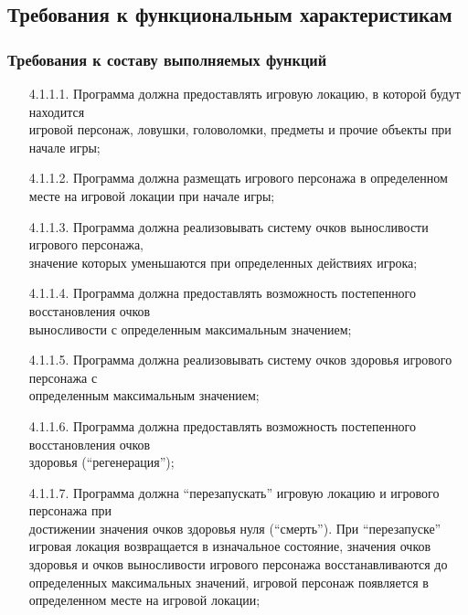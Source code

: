 \subsection{Требования к функциональным характеристикам}

\subsubsection{Требования к составу выполняемых функций}

\begin{enumerate}
    \item[4.1.1.1.] Программа должна предоставлять игровую локацию, в которой будут находится\\
    игровой персонаж, ловушки, головоломки, предметы и прочие объекты при начале игры;
    \item[4.1.1.2.] Программа должна размещать игрового персонажа в определенном месте на игровой локации при начале игры;
    \item[4.1.1.3.] Программа должна реализовывать систему очков выносливости игрового персонажа,\\
    значение которых уменьшаются при определенных действиях игрока;
    \item[4.1.1.4.] Программа должна предоставлять возможность постепенного восстановления очков\\
    выносливости с определенным максимальным значением;
    \item[4.1.1.5.] Программа должна реализовывать систему очков здоровья игрового персонажа с\\
    определенным максимальным значением;
    \item[4.1.1.6.] Программа должна предоставлять возможность постепенного восстановления очков\\
    здоровья (``регенерация'');
    \item[4.1.1.7.] Программа должна ``перезапускать'' игровую локацию и игрового персонажа при\\
    достижении значения очков здоровья нуля (``смерть''). При ``перезапуске'' игровая локация возвращается в изначальное состояние, значения очков здоровья и очков выносливости игрового персонажа восстанавливаются до определенных максимальных значений, игровой персонаж появляется в определенном месте на игровой локации;

\end{enumerate}
